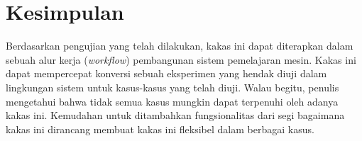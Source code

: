 \section{Kesimpulan}

Berdasarkan pengujian yang telah dilakukan, kakas ini dapat diterapkan dalam sebuah alur kerja (\textit{workflow}) pembangunan sistem pemelajaran mesin.
Kakas ini dapat mempercepat konversi sebuah eksperimen yang hendak diuji dalam lingkungan sistem untuk kasus-kasus yang telah diuji.
Walau begitu, penulis mengetahui bahwa tidak semua kasus mungkin dapat terpenuhi oleh adanya kakas ini.
Kemudahan untuk ditambahkan fungsionalitas dari segi bagaimana kakas ini dirancang membuat kakas ini fleksibel dalam berbagai kasus.